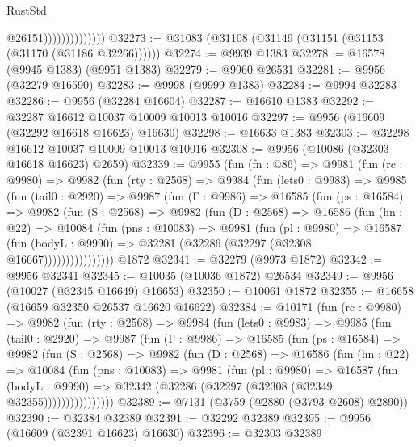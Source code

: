 \begin{lexlean}{RustStd}
\begin{coremodule}
                                @26151))))))))))))))
@32273 := @31083 (@31108 (@31149 (@31151 (@31153 (@31170 (@31186 @32266))))))
@32274 := @9939 @1383
@32278 := @16578 (@9945 @1383) (@9951 @1383)
@32279 := @9960 @26531
@32281 := @9956 (@32279 @16590)
@32283 := @9998 (@9999 @1383)
@32284 := @9994 @32283
@32286 := @9956 (@32284 @16604)
@32287 := @16610 @1383
@32292 := @32287 @16612 @10037 @10009 @10013 @10016
@32297 := @9956 (@16609 (@32292 @16618 @16623) @16630)
@32298 := @16633 @1383
@32303 := @32298 @16612 @10037 @10009 @10013 @10016
@32308 := @9956 (@10086 (@32303 @16618 @16623) @2659)
@32339 := @9955
    (fun (fn : @86) =>
    @9981
      (fun (rc : @9980) =>
      @9982
        (fun (rty : @2568) =>
        @9984
          (fun (lets0 : @9983) =>
          @9985
            (fun (tail0 : @2920) =>
            @9987
              (fun (Γ : @9986) =>
              @16585
                (fun (ps : @16584) =>
                @9982
                  (fun (S : @2568) =>
                  @9982
                    (fun (D : @2568) =>
                    @16586
                      (fun (hn : @22) =>
                      @10084
                        (fun (pns : @10083) =>
                        @9981
                          (fun (pl : @9980) =>
                          @16587
                            (fun (bodyL : @9990) =>
                            @32281 (@32286 (@32297 (@32308 @16667))))))))))))))))
    @1872
@32341 := @32279 (@9973 @1872)
@32342 := @9956 @32341
@32345 := @10035 (@10036 @1872) @26534
@32349 := @9956 (@10027 (@32345 @16649) @16653)
@32350 := @10061 @1872
@32355 := @16658 (@16659 @32350 @26537 @16620 @16622)
@32384 := @10171
    (fun (rc : @9980) =>
    @9982
      (fun (rty : @2568) =>
      @9984
        (fun (lets0 : @9983) =>
        @9985
          (fun (tail0 : @2920) =>
          @9987
            (fun (Γ : @9986) =>
            @16585
              (fun (ps : @16584) =>
              @9982
                (fun (S : @2568) =>
                @9982
                  (fun (D : @2568) =>
                  @16586
                    (fun (hn : @22) =>
                    @10084
                      (fun (pns : @10083) =>
                      @9981
                        (fun (pl : @9980) =>
                        @16587
                          (fun (bodyL : @9990) =>
                          @32342 (@32286 (@32297 (@32308 (@32349 @32355))))))))))))))))
@32389 := @7131 (@3759 (@2880 (@3793 @2608) @2890))
@32390 := @32384 @32389
@32391 := @32292 @32389
@32395 := @9956 (@16609 (@32391 @16623) @16630)
@32396 := @32303 @32389

\end{coremodule}
\end{lexlean}
